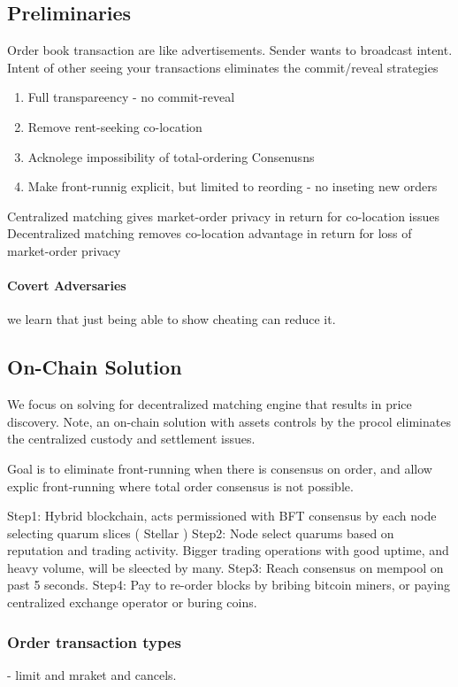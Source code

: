 \documentclass[12pt]{article}
\begin{document}
\subsection{Preliminaries}
Order book transaction are like advertisements. Sender wants to broadcast intent. Intent of other seeing your transactions eliminates the commit/reveal strategies 

\begin{enumerate}
    \item Full transpareency - no commit-reveal 
    \item Remove rent-seeking co-location 
    \item Acknolege impossibility of total-ordering Consenusns
    \item Make front-runnig explicit, but limited to reording - no inseting new orders 
\end{enumerate}

Centralized matching gives market-order privacy in return for co-location issues 
Decentralized matching removes co-location advantage in return for loss of market-order privacy 

\paragraph*{Covert Adversaries} we learn that just being able to show cheating can reduce it. 

\subsection{On-Chain Solution}
We focus on solving for decentralized matching engine that results in price discovery. Note, an on-chain solution with assets controls by the procol eliminates the centralized custody and settlement issues. 

Goal is to eliminate front-running when there is consensus on order, and allow explic front-running where total order consensus is not possible.

Step1: Hybrid blockchain, acts permissioned with BFT consensus by each node selecting quarum slices  ( Stellar )
Step2: Node select quarums based on reputation and trading activity. Bigger trading operations with good uptime, and heavy volume, will be sleected by many. 
Step3: Reach consensus on mempool on past 5 seconds. 
Step4: Pay to re-order blocks by bribing bitcoin miners, or paying centralized exchange operator or buring coins. 


\subsubsection{Order transaction types} - limit and mraket and cancels. 
\end{document}

